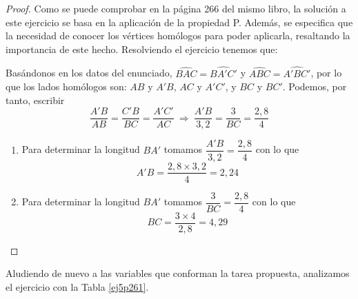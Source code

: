 \begin{multicols}{2}
	\end{multicols}

\begin{proof} Como se puede comprobar en la página 266 del mismo libro, la solución a este ejercicio se basa en la aplicación de la propiedad P. Además, se especifica que la necesidad de conocer los vértices homólogos para poder aplicarla, resaltando la importancia de este hecho. Resolviendo el ejercicio tenemos que:

	Basándonos en los datos del enunciado, $\hat{BAC}=\hat{BA'C'}$ y $\hat{ABC}=\hat{A'BC'}$, por lo que los lados homólogos son: $AB$ y $A'B$, $AC$ y $A'C'$, y $BC$ y $BC'$. Podemos, por tanto, escribir $$\dfrac{A'B}{AB}=\dfrac{C'B}{BC}=\dfrac{A'C'}{AC} \ \Longrightarrow \ \dfrac{A'B}{3,2}=\dfrac{3}{BC}=\dfrac{2,8}{4}$$
	
	\begin{enumerate}
		\item Para determinar la longitud $BA'$ tomamos $\dfrac{A'B}{3,2}=\dfrac{2,8}{4}$ con lo que $$A'B=\dfrac{2,8\times3,2}{4}=2,24$$
		\item Para determinar la longitud $BA'$ tomamos $\dfrac{3}{BC}=\dfrac{2,8}{4}$ con lo que $$BC=\dfrac{3\times4}{2,8}=4,29$$
	\end{enumerate}	
\end{proof}	
	
	Aludiendo de nuevo a las variables que conforman la tarea propuesta, analizamos el ejercicio con la Tabla \ref{ej5p261}.
	
